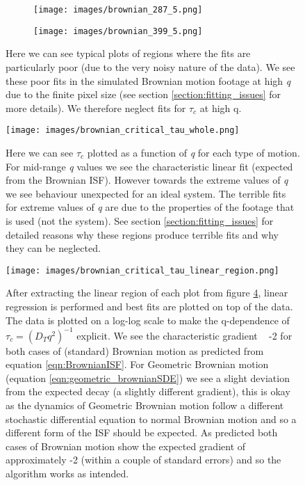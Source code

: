 \documentclass[10pt]{article}
\begin{document}
\begin{figure}[H]
\begin{subfigure}[t]{.5\textwidth}
  \centering
  \texttt{[image: images/brownian\_287\_5.png]}
  \label{fig:simulated_brownian1_37_5}
\end{subfigure}%
\hfill
\begin{subfigure}[t]{.5\textwidth}
  \centering
  \texttt{[image: images/brownian\_399\_5.png]}
 \label{fig:simulated_brownian1_67_5}
\end{subfigure}
\caption{Here we can see typical plots of regions where the fits are particularly poor (due to the very noisy nature of the data). We see these poor fits in the simulated Brownian motion footage at high \textit{q} due to the finite pixel size (see section \ref{section:fitting_issues} for more details). We therefore neglect fits for $\tau_c$ at high q.}
\label{fig:simulated_brownian_troubled}
\end{figure}

\begin{figure}[H]
\centering
\texttt{[image: images/brownian\_critical\_tau\_whole.png]}
\caption{Here we can see $\tau_c$ plotted as a function of \textit{q} for each type of motion. For mid-range \textit{q} values we see the characteristic linear fit (expected from the Brownian ISF). However towards the extreme values of \textit{q} we see behaviour unexpected for an ideal system. The terrible fits for extreme values of \textit{q} are due to the properties of the footage that is used (not the system). See section \ref{section:fitting_issues} for detailed reasons why these regions produce terrible fits and why they can be neglected.}
\label{fig:simulated_brownian_tauc_whole}
\end{figure}

\begin{figure}[H]
  \centering
\texttt{[image: images/brownian\_critical\_tau\_linear\_region.png]}
  \caption{After extracting the linear region of each plot from figure \ref{fig:simulated_brownian_tauc_whole}, linear regression is performed and best fits are plotted on top of the data. The data is plotted on a log-log scale to make the q-dependence of $\tau_c = (D_T q^{2})^{-1}$ explicit. We see the characteristic gradient ~ -2 for both cases of (standard) Brownian motion as predicted from equation \ref{eqn:BrownianISF}. For Geometric Brownian motion (equation \ref{eqn:geometric_brownianSDE}) we see a slight deviation from the expected decay (a slightly different gradient), this is okay as the dynamics of Geometric Brownian motion follow a different stochastic differential equation to normal Brownian motion and so a different form of the ISF should be expected. As predicted both cases of Brownian motion show the expected gradient of approximately -2 (within a couple of standard errors) and so the algorithm works as intended.}
 \label{fig:simulated_brownian_tauc_linear_region}
\end{figure}
\end{document}
